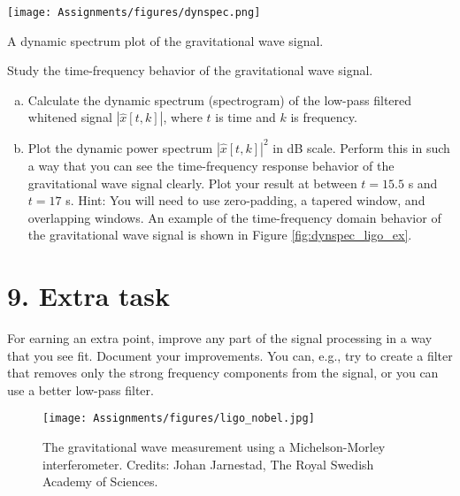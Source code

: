 \begin{marginfigure}
  \begin{center}
    \texttt{[image: Assignments/figures/dynspec.png]}
  \end{center}
  \caption{A dynamic spectrum plot of the gravitational wave signal.}
  \label{fig:dynspec_ligo_ex}
\end{marginfigure}

Study the time-frequency behavior of the gravitational wave signal.
\begin{enumerate}[a)]

  \item Calculate the dynamic spectrum (spectrogram) of the low-pass
        filtered whitened signal $|\hat{x}[t,k]|$, where $t$ is time and $k$
        is frequency.

  \item Plot the dynamic power spectrum $|\hat{x}[t,k]|^2$ in dB scale.
        Perform this in such a way that you can see the time-frequency response
        behavior of the gravitational wave signal clearly. Plot your result at
        between $t=15.5$ s and $t=17$ s. Hint: You will need to use zero-padding,
        a tapered window, and overlapping windows. An example of the time-frequency
        domain behavior of the gravitational wave signal is shown in Figure \ref{fig:dynspec_ligo_ex}.


\end{enumerate}


\section{9. Extra task}
For earning an extra point, improve any part of the signal processing
in a way that you see fit. Document your improvements. You can, e.g.,
try to create a filter that removes only the strong frequency
components from the signal, or you can use a better low-pass filter.

\begin{figure}
  \begin{center}
    \texttt{[image: Assignments/figures/ligo\_nobel.jpg]}
  \end{center}
  \caption{The gravitational wave measurement using a Michelson-Morley interferometer. Credits: Johan Jarnestad, The Royal Swedish Academy of Sciences.}
  \label{fig:ligo_nobel_diag}
\end{figure}

